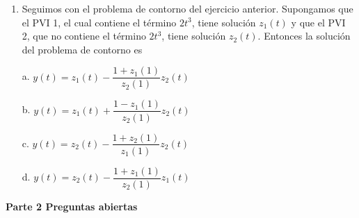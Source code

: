 \documentclass[11pt]{article}
\begin{document}
\begin{enumerate}
\noindent b. $v''=-tv'+t^2v,\ v(0)=0,\ v'(0)=1$.

\noindent c. $u''=-tu'+t^2u+2t^3,\ u(0)=0,\ u'(0)=1$.

\noindent d. $v''=-tv'+t^2v,\ v(0)=0,\ v'(0)=-1$.

\item{} Seguimos con el problema de contorno del ejercicio anterior. Supongamos que el PVI 1, el cual contiene el término $2t^3$, tiene solución $z_1(t)$ y que el PVI 2, que no contiene el término $2t^3$, tiene solución $z_2(t)$. Entonces la solución del problema de contorno es

\vspace{4pt}
\noindent a. $y(t) = z_1(t) - \dfrac{1+z_1(1)}{z_2(1)}z_2(t)$

\vspace{4pt}
\noindent b. $y(t) = z_1(t) + \dfrac{1-z_1(1)}{z_2(1)}z_2(t)$

\vspace{4pt}
\noindent c. $y(t) = z_2(t) - \dfrac{1+z_2(1)}{z_1(1)}z_2(t)$

\vspace{4pt}
\noindent d. $y(t) = z_2(t) - \dfrac{1+z_1(1)}{z_2(1)}z_1(t)$
\end{enumerate}

\vspace{10pt}
\noindent\textbf{Parte 2 Preguntas abiertas}
\end{document}
